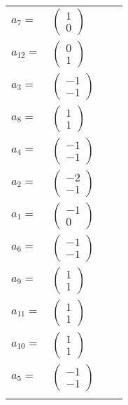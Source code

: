 \documentclass[1p]{elsarticle_modified}
\theoremstyle{definition}
\begin{document}
\begin{tabular}{m{7pt} m{180pt} m{7pt} m{180pt} }
\flushright $a_{7}=$&$\begin{pmatrix}1\\0\end{pmatrix}$ \\
\flushright $a_{12}=$&$\begin{pmatrix}0\\1\end{pmatrix}$ \\
\flushright $a_{3}=$&$\begin{pmatrix}-1\\-1\end{pmatrix}$ \\
\flushright $a_{8}=$&$\begin{pmatrix}1\\1\end{pmatrix}$ \\
\flushright $a_{4}=$&$\begin{pmatrix}-1\\-1\end{pmatrix}$ \\
\flushright $a_{2}=$&$\begin{pmatrix}-2\\-1\end{pmatrix}$ \\
\flushright $a_{1}=$&$\begin{pmatrix}-1\\0\end{pmatrix}$ \\
\flushright $a_{6}=$&$\begin{pmatrix}-1\\-1\end{pmatrix}$ \\
\flushright $a_{9}=$&$\begin{pmatrix}1\\1\end{pmatrix}$ \\
\flushright $a_{11}=$&$\begin{pmatrix}1\\1\end{pmatrix}$ \\
\flushright $a_{10}=$&$\begin{pmatrix}1\\1\end{pmatrix}$ \\
\flushright $a_{5}=$&$\begin{pmatrix}-1\\-1\end{pmatrix}$\\&\end{tabular}
\end{document}
